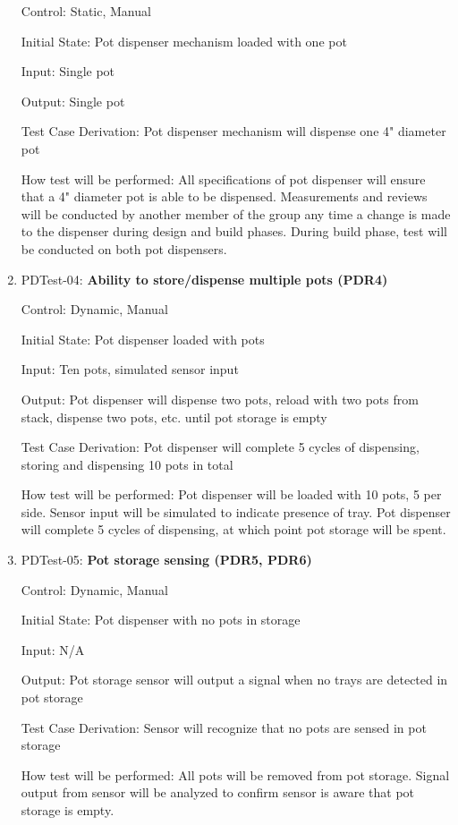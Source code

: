 \documentclass[12pt, titlepage]{article}
\begin{document}
\begin{enumerate}
  Control: Static, Manual

  Initial State: Pot dispenser mechanism loaded with one pot

  Input: Single pot

  Output: Single pot

  Test Case Derivation: Pot dispenser mechanism will dispense one 4" diameter pot

  How test will be performed: All specifications of pot dispenser will ensure that a 4" diameter pot is able 
  to be dispensed. Measurements and reviews will be conducted by another member of the group any time a change 
  is made to the dispenser during design and build phases. During build phase, test will be conducted on both 
  pot dispensers.

  \item{PDTest-04: \textbf{Ability to store/dispense multiple pots (PDR4)}\\}
  
  Control: Dynamic, Manual

  Initial State: Pot dispenser loaded with pots

  Input: Ten pots, simulated sensor input

  Output: Pot dispenser will dispense two pots, reload with two pots from stack, dispense two pots, etc. until
  pot storage is empty

  Test Case Derivation: Pot dispenser will complete 5 cycles of dispensing, storing and dispensing 10 pots in total

  How test will be performed: Pot dispenser will be loaded with 10 pots, 5 per side. Sensor input will be simulated
  to indicate presence of tray. Pot dispenser will complete 5 cycles of dispensing, at which point pot storage will
  be spent.
  
  \item{PDTest-05: \textbf{Pot storage sensing (PDR5, PDR6)}\\}
  
  Control: Dynamic, Manual

  Initial State: Pot dispenser with no pots in storage

  Input: N/A

  Output: Pot storage sensor will output a signal when no trays are detected in pot storage

  Test Case Derivation: Sensor will recognize that no pots are sensed in pot storage

  How test will be performed: All pots will be removed from pot storage. Signal output from sensor will be
  analyzed to confirm sensor is aware that pot storage is empty.

\end{enumerate}
\end{document}
